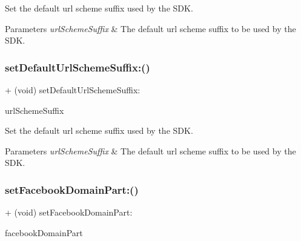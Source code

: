 Set the default url scheme suffix used by the S\+DK.


\begin{DoxyParams}{Parameters}
{\em url\+Scheme\+Suffix} & The default url scheme suffix to be used by the S\+DK. \\
\hline
\end{DoxyParams}
\mbox{\label{interfaceFBSettings_a08a9504a71c1c9ec329e97da7c636337}} 
\subsubsection{\texorpdfstring{set\+Default\+Url\+Scheme\+Suffix\+:()}{setDefaultUrlSchemeSuffix:()}\hspace{0.1cm}{\footnotesize\ttfamily [5/5]}}
{\footnotesize\ttfamily + (void) set\+Default\+Url\+Scheme\+Suffix\+: \begin{DoxyParamCaption}\item[{(N\+S\+String $\ast$)}]{url\+Scheme\+Suffix }\end{DoxyParamCaption}}

Set the default url scheme suffix used by the S\+DK.


\begin{DoxyParams}{Parameters}
{\em url\+Scheme\+Suffix} & The default url scheme suffix to be used by the S\+DK. \\
\hline
\end{DoxyParams}
\mbox{\label{interfaceFBSettings_a4cfd61825c72f8a5978cb07ba84983d1}} 
\subsubsection{\texorpdfstring{set\+Facebook\+Domain\+Part\+:()}{setFacebookDomainPart:()}\hspace{0.1cm}{\footnotesize\ttfamily [1/5]}}
{\footnotesize\ttfamily + (void) set\+Facebook\+Domain\+Part\+: \begin{DoxyParamCaption}\item[{(N\+S\+String $\ast$)}]{facebook\+Domain\+Part }\end{DoxyParamCaption}}

